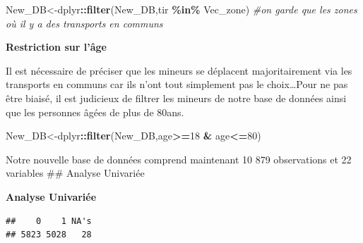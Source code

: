 \documentclass[
]{article}
\newenvironment{Shaded}{\begin{snugshade}}{\end{snugshade}}
\newcommand{\CommentTok}[1]{\textcolor[rgb]{0.56,0.35,0.01}{\textit{#1}}}
\newcommand{\DecValTok}[1]{\textcolor[rgb]{0.00,0.00,0.81}{#1}}
\newcommand{\FunctionTok}[1]{\textcolor[rgb]{0.13,0.29,0.53}{\textbf{#1}}}
\newcommand{\NormalTok}[1]{#1}
\newcommand{\OtherTok}[1]{\textcolor[rgb]{0.56,0.35,0.01}{#1}}
\newcommand{\SpecialCharTok}[1]{\textcolor[rgb]{0.81,0.36,0.00}{\textbf{#1}}}
\begin{document}
\begin{Shaded}
\begin{Highlighting}[]
\NormalTok{New\_DB}\OtherTok{\textless{}{-}}\NormalTok{dplyr}\SpecialCharTok{::}\FunctionTok{filter}\NormalTok{(New\_DB,tir }\SpecialCharTok{\%in\%}\NormalTok{ Vec\_zone) }\CommentTok{\#on garde que les zones où il y a des transports en communs }
\end{Highlighting}
\end{Shaded}

\textbf{Restriction sur l'âge}\newline

Il est nécessaire de préciser que les mineurs se déplacent
majoritairement via les transports en communs car ils n'ont tout
simplement pas le choix\ldots{}\newline Pour ne pas être biaisé, il est
judicieux de filtrer les mineurs de notre base de données ainsi que les
personnes âgées de plus de 80ans.

\begin{Shaded}
\begin{Highlighting}[]
\NormalTok{New\_DB}\OtherTok{\textless{}{-}}\NormalTok{dplyr}\SpecialCharTok{::}\FunctionTok{filter}\NormalTok{(New\_DB,age}\SpecialCharTok{\textgreater{}=}\DecValTok{18} \SpecialCharTok{\&}\NormalTok{ age}\SpecialCharTok{\textless{}=}\DecValTok{80}\NormalTok{)}
\end{Highlighting}
\end{Shaded}

Notre nouvelle base de données comprend maintenant 10 879 observations
et 22 variables \#\# Analyse Univariée\newline

\textbf{Analyse Univariée}

\begin{Shaded}
\end{Shaded}

\begin{verbatim}
##    0    1 NA's 
## 5823 5028   28
\end{verbatim}

\begin{Shaded}
\end{Shaded}
\end{document}

